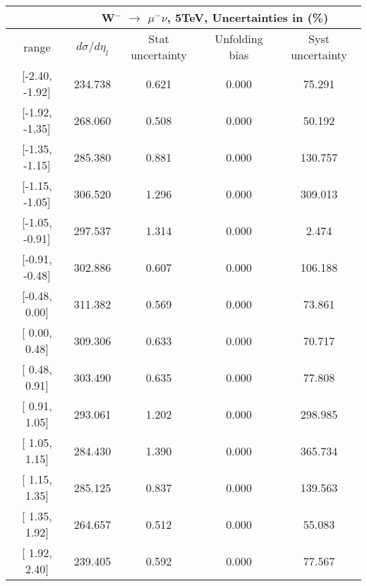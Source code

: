 \documentclass[12pt]{article}
\begin{document}
 
\begin{table}[] 
\begin{tabular}{c|c|c|c|c|}
\cline{2-5}
& \multicolumn{4}{c|}{W$^{-}$ $\rightarrow$ $\mu^{-} \nu $, 5TeV, Uncertainties in (\%)}  \\ \hline \hline 
\multicolumn{1}{|c|}{  range } & $d\sigma$/$d\eta_{l}$   & Stat uncertainty     & Unfolding bias     & Syst uncertainty        \\ \hline \hline 
\multicolumn{1}{|c|}{{[}-2.40,  -1.92{]}}  & 234.738 & 0.621 & 0.000 & 75.291 \\ \hline 
\multicolumn{1}{|c|}{{[}-1.92,  -1.35{]}}  & 268.060 & 0.508 & 0.000 & 50.192 \\ \hline 
\multicolumn{1}{|c|}{{[}-1.35,  -1.15{]}}  & 285.380 & 0.881 & 0.000 & 130.757 \\ \hline 
\multicolumn{1}{|c|}{{[}-1.15,  -1.05{]}}  & 306.520 & 1.296 & 0.000 & 309.013 \\ \hline 
\multicolumn{1}{|c|}{{[}-1.05,  -0.91{]}}  & 297.537 & 1.314 & 0.000 & 2.474 \\ \hline 
\multicolumn{1}{|c|}{{[}-0.91,  -0.48{]}}  & 302.886 & 0.607 & 0.000 & 106.188 \\ \hline 
\multicolumn{1}{|c|}{{[}-0.48,   0.00{]}}  & 311.382 & 0.569 & 0.000 & 73.861 \\ \hline 
\multicolumn{1}{|c|}{{[} 0.00,   0.48{]}}  & 309.306 & 0.633 & 0.000 & 70.717 \\ \hline 
\multicolumn{1}{|c|}{{[} 0.48,   0.91{]}}  & 303.490 & 0.635 & 0.000 & 77.808 \\ \hline 
\multicolumn{1}{|c|}{{[} 0.91,   1.05{]}}  & 293.061 & 1.202 & 0.000 & 298.985 \\ \hline 
\multicolumn{1}{|c|}{{[} 1.05,   1.15{]}}  & 284.430 & 1.390 & 0.000 & 365.734 \\ \hline 
\multicolumn{1}{|c|}{{[} 1.15,   1.35{]}}  & 285.125 & 0.837 & 0.000 & 139.563 \\ \hline 
\multicolumn{1}{|c|}{{[} 1.35,   1.92{]}}  & 264.657 & 0.512 & 0.000 & 55.083 \\ \hline 
\multicolumn{1}{|c|}{{[} 1.92,   2.40{]}}  & 239.405 & 0.592 & 0.000 & 77.567 \\ \hline 
\end{tabular}
\end{table}
\end{document}
